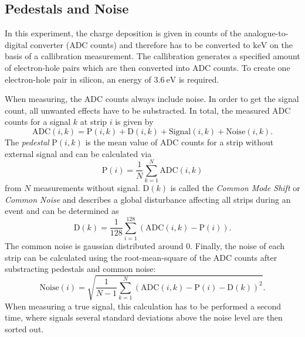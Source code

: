 \subsection{Pedestals and Noise}
In this experiment, the charge deposition is given in counts of the analogue-to-digital converter (ADC counts) and therefore has to be converted to $\unit{\kilo\eV}$ 
on the basis of a callibration measurement. The callibration generates a specified amount of electron-hole pairs which are then converted into ADC counts.
To create one electron-hole pair in silicon, an energy of $\qty{3.6}{\eV}$ \cite{SiliconStrip} is required.

When measuring, the ADC counts always include noise. In order to get the signal count, all unwanted effects have to be substracted.
In total, the measured ADC counts for a signal $k$ at strip $i$ is given by 
\begin{equation}
    \text{ADC}(i, k) = \text{P}(i, k) + \text{D}(i,k) + \text{Signal}(i, k) + \text{Noise}(i, k).
    \label{eq:ADC}
\end{equation}    
The \textit{pedestal} $\text{P}(i, k)$ is the mean value of ADC counts for a strip without external signal and can be calculated via 
\begin{equation}
    \text{P}(i) = \frac{1}{N} \sum^N_{k = 1} \text{ADC}(i,k)
    \label{eq:pedestals}
\end{equation}
from $N$ measurements without signal. $\text{D}(k)$ is called the \textit{Common Mode Shift} or \textit{Common Noise} and describes a global disturbance affecting all 
strips during an event and can be determined as 
\begin{equation}
    \text{D}(k) = \frac{1}{128} \sum^{128}_{i = 1} (\text{ADC}(i,k) -\text{P}(i)).
    \label{eq:common_noise}
\end{equation}
The common noise is gaussian distributed around 0.
Finally, the noise of each strip can be calculated using the root-mean-square of the ADC counts after substracting pedestals and common noise:
\begin{equation}
    \text{Noise}(i) = \sqrt{\frac{1}{N-1} \sum^{N}_{k = 1} (\text{ADC}(i,k) -\text{P}(i) - \text{D}(k))^2}.
    \label{eq:noise}
\end{equation}
When measuring a true signal, this calculation has to be performed a second time, where signals several standard deviations above the noise level are then sorted out.

